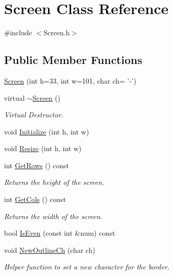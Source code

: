 \hypertarget{classScreen}{\section{Screen Class Reference}
\label{classScreen}
}


{\ttfamily \#include $<$Screen.\-h$>$}

\subsection*{Public Member Functions}
\begin{DoxyCompactItemize}
\item 
\hyperlink{classScreen_a932b81c3d221d644cc40ffe9003515a5}{Screen} (int h=33, int w=101, char ch= '-\/')
\item 
virtual \hyperlink{classScreen_a4243bc17596af96415b09ac48205676d}{$\sim$\-Screen} ()
\begin{DoxyCompactList}\small\item\em Virtual Destructor. \end{DoxyCompactList}\item 
void \hyperlink{classScreen_a455b38b1ac9b18bd67ecd2e056dff909}{Initialize} (int h, int w)
\item 
void \hyperlink{classScreen_a11f9842c836301989f7c3d84eb043700}{Resize} (int h, int w)
\item 
int \hyperlink{classScreen_aa12cc4ea36f5d2ac98b3c7334616acbc}{Get\-Rows} () const 
\begin{DoxyCompactList}\small\item\em Returns the height of the screen. \end{DoxyCompactList}\item 
int \hyperlink{classScreen_a223cd8821b2b8006c61545ff41aa0091}{Get\-Cols} () const 
\begin{DoxyCompactList}\small\item\em Returns the width of the screen. \end{DoxyCompactList}\item 
bool \hyperlink{classScreen_af7a18ec4e53fb371293e9ebcc23b7e2b}{Is\-Even} (const int \&num) const 
\item 
void \hyperlink{classScreen_a27dcfac6e64ab72059d0801dd9714d7a}{New\-Outline\-Ch} (char ch)
\begin{DoxyCompactList}\small\item\em Helper function to set a new character for the border. \end{DoxyCompactList}\item 

\end{DoxyCompactItemize}
